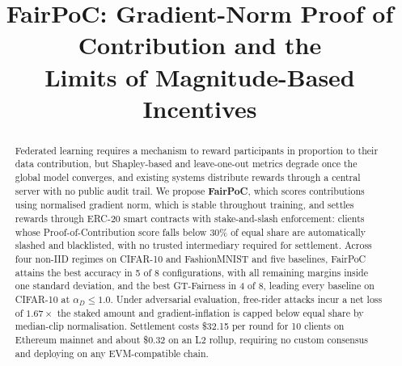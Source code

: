 \documentclass[conference]{IEEEtran}
\theoremstyle{remark}
\begin{document}
\title{FairPoC: Gradient-Norm Proof of Contribution and the\\
Limits of Magnitude-Based Incentives}

\newif\ifanon
\anonfalse
\ifanon
  \author{\IEEEauthorblockN{Anonymous Submission}
  \IEEEauthorblockA{Paper ID: \textit{(assigned at submission)}}}
\else
  \author{
  }
\fi

\maketitle

\begin{abstract}
Federated learning requires a mechanism to reward participants in
proportion to their data contribution, but Shapley-based and
leave-one-out metrics degrade once the global model converges, and
existing systems distribute rewards through a central server with no
public audit trail. We propose \textbf{FairPoC}, which scores
contributions using normalised gradient norm, which is stable throughout
training, and settles rewards through ERC-20 smart contracts with
stake-and-slash enforcement: clients whose Proof-of-Contribution score
falls below 30\% of equal share are automatically slashed and
blacklisted, with no trusted intermediary required for settlement.
Across four non-IID regimes on CIFAR-10 and FashionMNIST and five
baselines, FairPoC attains the best accuracy in 5 of 8 configurations,
with all remaining margins inside one standard deviation, and the best
GT-Fairness in 4 of 8, leading every baseline on CIFAR-10 at
$\alpha_D \leq 1.0$. Under adversarial evaluation, free-rider
attacks incur a net loss of $1.67\times$ the staked amount and
gradient-inflation is capped below equal share by median-clip
normalisation. Settlement costs \$32.15 per round for 10 clients on
Ethereum mainnet and about \$0.32 on an L2 rollup, requiring no custom
consensus and deploying on any EVM-compatible chain.
\end{abstract}
\end{document}
